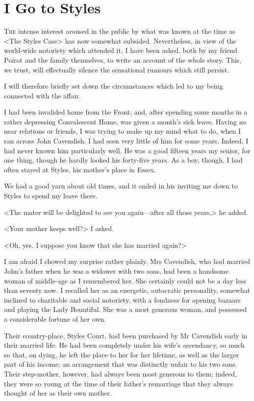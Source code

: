 \chapter{I Go to Styles}
	
\lettrine{T}{he} intense interest aroused in the public by what was known at the time as <The Styles Case> has now somewhat subsided. Nevertheless, in view of the world-wide notoriety which attended it, I have been asked, both by my friend Poirot and the family themselves, to write an account of the whole story. This, we trust, will effectually silence the sensational rumours which still persist. 

 I will therefore briefly set down the circumstances which led to my being connected with the affair. 

 I had been invalided home from the Front; and, after spending some months in a rather depressing Convalescent Home, was given a month's sick leave. Having no near relations or friends, I was trying to make up my mind what to do, when I ran across John Cavendish. I had seen very little of him for some years. Indeed, I had never known him particularly well. He was a good fifteen years my senior, for one thing, though he hardly looked his forty-five years. As a boy, though, I had often stayed at Styles, his mother's place in Essex. 

 We had a good yarn about old times, and it ended in his inviting me down to Styles to spend my leave there. 

 <The mater will be delighted to see you again—after all those years,> he added. 

 <Your mother keeps well?> I asked. 

 <Oh, yes. I suppose you know that she has married again?> 

 I am afraid I showed my surprise rather plainly. Mrs Cavendish, who had married John's father when he was a widower with two sons, had been a handsome woman of middle-age as I remembered her. She certainly could not be a day less than seventy now. I recalled her as an energetic, autocratic personality, somewhat inclined to charitable and social notoriety, with a fondness for opening bazaars and playing the Lady Bountiful. She was a most generous woman, and possessed a considerable fortune of her own. 

 Their country-place, Styles Court, had been purchased by Mr Cavendish early in their married life. He had been completely under his wife's ascendancy, so much so that, on dying, he left the place to her for her lifetime, as well as the larger part of his income; an arrangement that was distinctly unfair to his two sons. Their step-mother, however, had always been most generous to them; indeed, they were so young at the time of their father's remarriage that they always thought of her as their own mother. 

